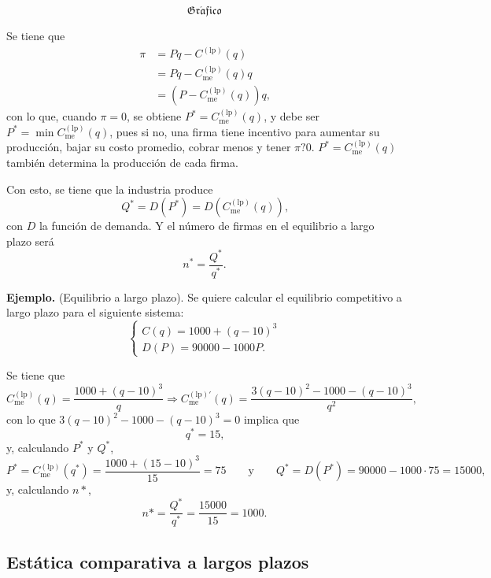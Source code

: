 \documentclass{report}
\newcommand{\GRAF}{\begin{center}$$\mathfrak{Gr\acute{a}fico}$$\end{center}}
\newenvironment{example}[1]{\noindent\setlength{\parskip}{0pt}\textbf{Ejemplo.} (#1).}{}
\begin{document}
\GRAF

Se tiene que
\begin{align*}
\pi & = Pq-C^{\left(\text{lp}\right)}\!\left(q\right) \\
& = Pq - C_\text{me}^{\left(\text{lp}\right)}\!\left(q\right)q\\
& = \left(P-C_\text{me}^{\left(\text{lp}\right)}\!\left(q\right)\right)q\text{,}
\end{align*}
con lo que, cuando $\pi=0$, se obtiene $P^*=C_\text{me}^{\left(\text{lp}\right)}\!\left(q\right)$, y debe ser $P^*=\min C_\text{me}^{\left(\text{lp}\right)}\!\left(q\right)$, pues si no, una firma tiene incentivo para aumentar su producción, bajar su costo promedio, cobrar menos y tener $\pi?0$. $P^*=C_\text{me}^{\left(\text{lp}\right)}\!\left(q\right)$ también determina la producción de cada firma.

Con esto, se tiene que la industria produce
$$Q^*=D\!\left(P^*\right)=D\!\left(C_\text{me}^{\left(\text{lp}\right)}\!\left(q\right)\right)\text{,}$$
con $D$ la función de demanda. Y el número de firmas en el equilibrio a largo plazo será
\[ n^*=\frac{Q^*}{q^*}\text{.} \]


\begin{example}{Equilibrio a largo plazo}
Se quiere calcular el equilibrio competitivo a largo plazo para el siguiente sistema:
\[\begin{cases}
C\!\left(q\right)=1000+\left(q-10\right)^3 \\
D\!\left(P\right)=90000-1000P\text{.}
\end{cases}\]

Se tiene que
\[
C_\text{me}^{\left(\text{lp}\right)}\!\left(q\right)=\frac{1000+\left(q-10\right)^3}{q}\Rightarrow C_\text{me}^{\left(\text{lp}\right)\prime}\!\left(q\right)=\frac{3\left(q-10\right)^2-1000-\left(q-10\right)^3}{q^2}\text{,}
\]
con lo que $3\left(q-10\right)^2-1000-\left(q-10\right)^3=0$ implica que
\[ q^*=15\text{,} \]
y, calculando $P^*$ y $Q^*$,
\[
P^*=C_\text{me}^{\left(\text{lp}\right)}\!\left(q^*\right)=\frac{1000+\left(15-10\right)^3}{15}=75\qquad\text{y}\qquad Q^*=D\!\left(P^*\right)=90000-1000\cdot75=15000\text{,}
\]
y, calculando $n*$,
\[
n*=\frac{Q^*}{q^*}=\frac{15000}{15}=1000\text{.}
\]
\end{example}

\subsection{Estática comparativa a largos plazos}
\end{document}
